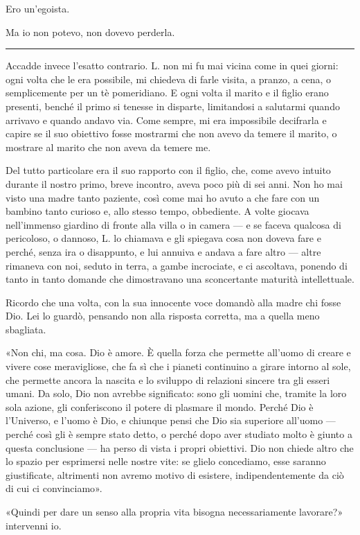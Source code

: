 \documentclass[a4paper,11pt,oneside,openright,final]{memoir}
\begin{document}
Ero un'egoista.

Ma io non potevo, non dovevo perderla.

\plainbreak{1}

Accadde invece l'esatto contrario. L. non mi fu mai vicina come in quei giorni:
ogni volta che le era possibile, mi chiedeva di farle visita, a pranzo, a cena,
o semplicemente per un tè pomeridiano. E ogni volta il marito e il figlio erano
presenti, benché il primo si tenesse in disparte, limitandosi a salutarmi quando
arrivavo e quando andavo via. Come sempre, mi era impossibile decifrarla e
capire se il suo obiettivo fosse mostrarmi che non avevo da temere il marito, o
mostrare al marito che non aveva da temere me.

Del tutto particolare era il suo rapporto con il figlio, che, come avevo intuito
durante il nostro primo, breve incontro, aveva poco più di sei anni. Non ho mai
visto una madre tanto paziente, così come mai ho avuto a che fare con un bambino
tanto curioso e, allo stesso tempo, obbediente. A volte giocava nell'immenso
giardino di fronte alla villa o in camera --- e se faceva qualcosa di
pericoloso, o dannoso, L. lo chiamava e gli spiegava cosa non doveva fare e
perché, senza ira o disappunto, e lui annuiva e andava a fare altro --- altre
rimaneva con noi, seduto in terra, a gambe incrociate, e ci ascoltava, ponendo
di tanto in tanto domande che dimostravano una sconcertante maturità
intellettuale.

Ricordo che una volta, con la sua innocente voce domandò alla madre chi fosse
Dio. Lei lo guardò, pensando non alla risposta corretta, ma a quella meno
sbagliata.

«Non chi, ma cosa. Dio è amore. È quella forza che permette all'uomo di creare
e vivere cose meravigliose, che fa sì che i pianeti continuino a girare intorno
al sole, che permette ancora la nascita e lo sviluppo di relazioni sincere tra
gli esseri umani. Da solo, Dio non avrebbe significato: sono gli uomini che,
tramite la loro sola azione, gli conferiscono il potere di plasmare il mondo.
Perché Dio è l'Universo, e l'uomo è Dio, e chiunque pensi che Dio sia superiore
all'uomo --- perché così gli è sempre stato detto, o perché dopo aver studiato
molto è giunto a questa conclusione --- ha perso di vista i propri obiettivi.
Dio non chiede altro che lo spazio per esprimersi nelle nostre vite: se glielo
concediamo, esse saranno giustificate, altrimenti non avremo motivo di esistere,
indipendentemente da ciò di cui ci convinciamo».

«Quindi per dare un senso alla propria vita bisogna necessariamente lavorare?»
intervenni io.
\end{document}
